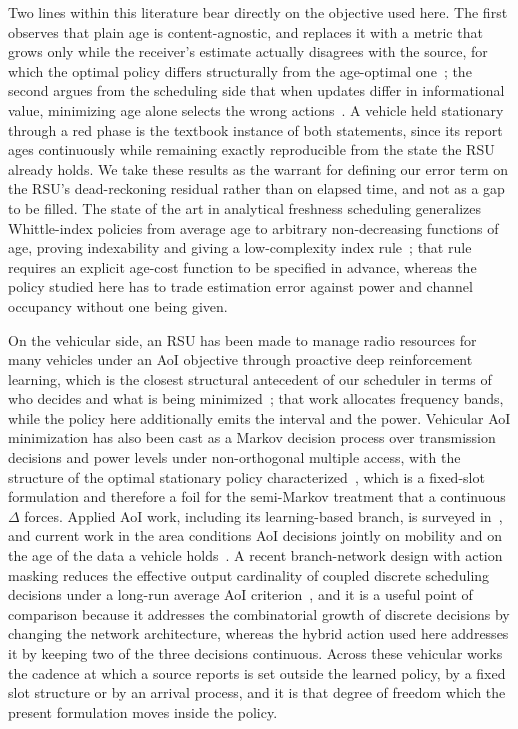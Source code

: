 \documentclass[journal]{IEEEtran}
\begin{document}
Two lines within this literature bear directly on the objective used here. The first observes that plain age is content-agnostic, and replaces it with a metric that grows only while the receiver's estimate actually disagrees with the source, for which the optimal policy differs structurally from the age-optimal one~\cite{maatouk2020}; the second argues from the scheduling side that when updates differ in informational value, minimizing age alone selects the wrong actions~\cite{rajaraman2021}. A vehicle held stationary through a red phase is the textbook instance of both statements, since its report ages continuously while remaining exactly reproducible from the state the RSU already holds. We take these results as the warrant for defining our error term on the RSU's dead-reckoning residual rather than on elapsed time, and not as a gap to be filled. The state of the art in analytical freshness scheduling generalizes Whittle-index policies from average age to arbitrary non-decreasing functions of age, proving indexability and giving a low-complexity index rule~\cite{tripathi2024}; that rule requires an explicit age-cost function to be specified in advance, whereas the policy studied here has to trade estimation error against power and channel occupancy without one being given.

On the vehicular side, an RSU has been made to manage radio resources for many vehicles under an AoI objective through proactive deep reinforcement learning, which is the closest structural antecedent of our scheduler in terms of who decides and what is being minimized~\cite{chen2020}; that work allocates frequency bands, while the policy here additionally emits the interval and the power. Vehicular AoI minimization has also been cast as a Markov decision process over transmission decisions and power levels under non-orthogonal multiple access, with the structure of the optimal stationary policy characterized~\cite{abbas2023}, which is a fixed-slot formulation and therefore a foil for the semi-Markov treatment that a continuous $\Delta$ forces. Applied AoI work, including its learning-based branch, is surveyed in~\cite{kahraman2024}, and current work in the area conditions AoI decisions jointly on mobility and on the age of the data a vehicle holds~\cite{tadele2026}. A recent branch-network design with action masking reduces the effective output cardinality of coupled discrete scheduling decisions under a long-run average AoI criterion~\cite{xie2025}, and it is a useful point of comparison because it addresses the combinatorial growth of discrete decisions by changing the network architecture, whereas the hybrid action used here addresses it by keeping two of the three decisions continuous. Across these vehicular works the cadence at which a source reports is set outside the learned policy, by a fixed slot structure or by an arrival process, and it is that degree of freedom which the present formulation moves inside the policy.
\end{document}
